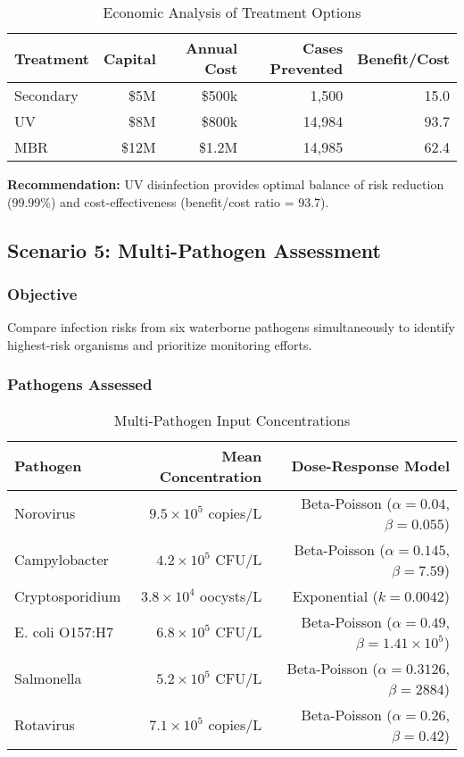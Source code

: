 \documentclass[11pt,a4paper]{article}
\begin{document}
\begin{table}[H]
\centering
\caption{Economic Analysis of Treatment Options}
\begin{tabular}{lrrrr}
\toprule
\textbf{Treatment} & \textbf{Capital} & \textbf{Annual Cost} & \textbf{Cases Prevented} & \textbf{Benefit/Cost} \\
\midrule
Secondary & \$5M & \$500k & 1,500 & 15.0 \\
UV & \$8M & \$800k & 14,984 & 93.7 \\
MBR & \$12M & \$1.2M & 14,985 & 62.4 \\
\bottomrule
\end{tabular}
\end{table}

\textbf{Recommendation:} UV disinfection provides optimal balance of risk reduction (99.99\%) and cost-effectiveness (benefit/cost ratio = 93.7).

\subsection{Scenario 5: Multi-Pathogen Assessment}

\subsubsection{Objective}

Compare infection risks from six waterborne pathogens simultaneously to identify highest-risk organisms and prioritize monitoring efforts.

\subsubsection{Pathogens Assessed}

\begin{table}[H]
\centering
\caption{Multi-Pathogen Input Concentrations}
\begin{tabular}{lrr}
\toprule
\textbf{Pathogen} & \textbf{Mean Concentration} & \textbf{Dose-Response Model} \\
\midrule
Norovirus & $9.5 \times 10^5$ copies/L & Beta-Poisson ($\alpha=0.04$, $\beta=0.055$) \\
Campylobacter & $4.2 \times 10^5$ CFU/L & Beta-Poisson ($\alpha=0.145$, $\beta=7.59$) \\
Cryptosporidium & $3.8 \times 10^4$ oocysts/L & Exponential ($k=0.0042$) \\
E. coli O157:H7 & $6.8 \times 10^5$ CFU/L & Beta-Poisson ($\alpha=0.49$, $\beta=1.41\times10^5$) \\
Salmonella & $5.2 \times 10^5$ CFU/L & Beta-Poisson ($\alpha=0.3126$, $\beta=2884$) \\
Rotavirus & $7.1 \times 10^5$ copies/L & Beta-Poisson ($\alpha=0.26$, $\beta=0.42$) \\
\bottomrule
\end{tabular}
\end{table}
\end{document}
